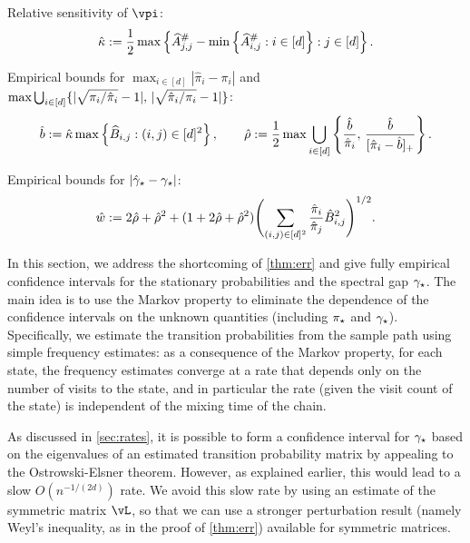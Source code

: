 \begin{algorithm}
\begin{algorithmic}[1]
  \STATE Relative sensitivity of $\vpi$:
  \begin{equation}
    \hat\kappa :=
    \frac12
    \max
    \left\{
      \widehat{A}_{j,j}^\# - \min\left\{ \widehat{A}_{i,j}^\# : i \in [d] \right\}
      : j \in [d]
    \right\} 
    .
    \notag
  \end{equation}
  \label{step:sens}

  \STATE Empirical bounds for $\max_{i \in [d]} |\hat{\pi}_i -
  \pi_i|$ and
  $\max\bigcup_{i\in[d]}
  \{
    |\sqrt{\pi_i/\hat\pi_i}-1|,\,
    |\sqrt{\hat\pi_i/\pi_i}-1|
  \}$:
  \begin{equation}
    \hat{b} := \hat\kappa \max\left\{
      \widehat{B}_{i,j}
      : (i,j) \in [d]^2
    \right\}
    , \qquad
    \hat\rho := \frac12 \max \bigcup_{i\in[d]}
    \left\{
      \frac{\hat{b}}{\hat\pi_i},\,
      \frac{\hat{b}}{[\hat\pi_i-\hat{b}]_+}
    \right\}
    .
    \notag
  \end{equation}
  \label{step:pi-bound}

  \STATE Empirical bounds for $|\hat\gamma_{\star}-\gamma_{\star}|$:
  \begin{equation}
    \hat{w} := 2\hat\rho + \hat\rho^2
    + (1+2\hat\rho+\hat\rho^2)
    \Biggl(
      \sum_{(i,j)\in[d]^2} \frac{\hat\pi_i}{\hat\pi_j} \hat{B}_{i,j}^2
    \Biggr)^{1/2} .
    \notag
  \end{equation}
  \label{step:gap-bound}


\end{algorithmic}
\end{algorithm}

In this section, we address the shortcoming of \cref{thm:err} and give
fully empirical confidence intervals for the stationary probabilities
and the spectral gap $\gamma_{\star}$.
The main idea is to use the Markov property to eliminate the
dependence of the confidence intervals on the unknown quantities
(including $\pi_{\star}$ and $\gamma_{\star}$).
Specifically, we estimate the transition probabilities from the sample
path using simple frequency estimates: as a consequence of the Markov
property, for each state, the frequency estimates converge at a rate
that depends only on the number of visits to the state, and in
particular the rate (given the visit count of the state) is
independent of the mixing time of the chain.

As discussed in \cref{sec:rates}, it is possible to form a confidence
interval for $\gamma_{\star}$ based on the eigenvalues of an estimated
transition probability matrix by appealing to the
Ostrowski-Elsner theorem.
However, as explained earlier, this would lead to a slow
$O(n^{-1/(2d)})$ rate.
We avoid this slow rate by using an estimate of the symmetric matrix
$\vL$, so that we can use a stronger perturbation result (namely Weyl's
inequality, as in the proof of \cref{thm:err}) available for symmetric matrices.

